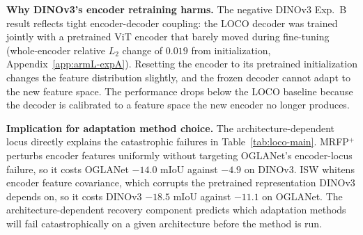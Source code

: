 \textbf{Why DINOv3's encoder retraining harms.} The negative DINOv3 Exp.~B result reflects tight encoder-decoder coupling: the LOCO decoder was trained jointly with a pretrained ViT encoder that barely moved during fine-tuning (whole-encoder relative $L_2$ change of $0.019$ from initialization, Appendix~\ref{app:armL-expA}). Resetting the encoder to its pretrained initialization changes the feature distribution slightly, and the frozen decoder cannot adapt to the new feature space. The performance drops below the LOCO baseline because the decoder is calibrated to a feature space the new encoder no longer produces.

\textbf{Implication for adaptation method choice.} The architecture-dependent locus directly explains the catastrophic failures in Table~\ref{tab:loco-main}. MRFP$^+$ perturbs encoder features uniformly without targeting OGLANet's encoder-locus failure, so it costs OGLANet $-14.0$ mIoU against $-4.9$ on DINOv3. ISW whitens encoder feature covariance, which corrupts the pretrained representation DINOv3 depends on, so it costs DINOv3 $-18.5$ mIoU against $-11.1$ on OGLANet. The architecture-dependent recovery component predicts which adaptation methods will fail catastrophically on a given architecture before the method is run.